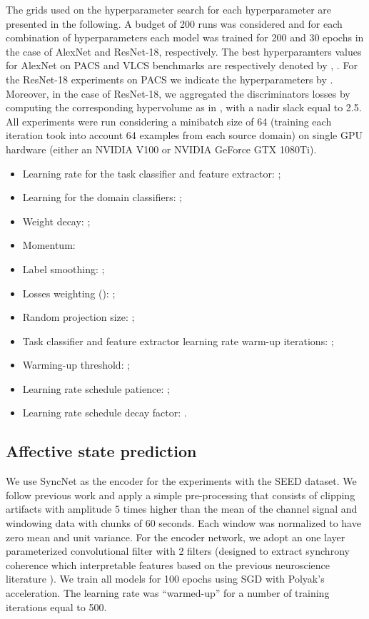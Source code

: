 \documentclass{article}
\begin{document}
The grids used on the hyperparameter search for each hyperparameter are presented in the following. A budget of 200 runs was considered and for each combination of hyperparameters each model was trained for 200 and 30 epochs in the case of AlexNet and ResNet-18, respectively. The best hyperparamters values for AlexNet on PACS and VLCS benchmarks are respectively denoted by  , . For the ResNet-18 experiments on PACS we indicate the hyperparameters by . Moreover, in the case of ResNet-18, we aggregated the discriminators losses by computing the corresponding hypervolume as in \cite{albuquerque2019multi}, with a nadir slack equal to 2.5. All experiments were run considering a minibatch size of 64 (training each iteration took into account 64 examples from each source domain) on single GPU hardware (either an NVIDIA V100 or NVIDIA GeForce GTX 1080Ti).

\begin{itemize}
    \item Learning rate for the task classifier and feature extractor: ;
    \item Learning for the domain classifiers: ;
    \item Weight decay: ;
    \item Momentum: 
    \item Label smoothing: ;
    \item Losses weighting (): ;
    \item Random projection size: ;
    \item Task classifier and feature extractor learning rate warm-up iterations: ;
    \item Warming-up threshold: ;
    \item Learning rate schedule patience: ;
    \item Learning rate schedule decay factor: .
\end{itemize}

\subsection{Affective state prediction}
We use SyncNet \cite{li2017targeting} as the encoder for the experiments with the SEED dataset. We follow previous work and apply a simple pre-processing that consists of clipping artifacts with amplitude 5 times higher than the mean of the channel signal and windowing data with chunks of 60 seconds. Each window was normalized to have zero mean and unit variance. For the encoder network, we adopt an one layer parameterized convolutional filter with 2 filters (designed to extract synchrony coherence which interpretable features based on the previous neuroscience literature \cite{li2017targeting}). We train all models for 100 epochs using SGD with Polyak’s acceleration. The learning rate was ``warmed-up'' for a number of training iterations equal to 500.
\end{document}
